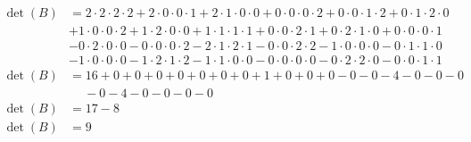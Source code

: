 \documentclass[12pt]{article}
\begin{document}
\[
\begin{aligned}
    \operatorname{det}(B) & = 2 \cdot 2 \cdot 2 \cdot 2 + 2 \cdot 0 \cdot 0 \cdot 1 + 2 \cdot 1 \cdot 0 
    \cdot 0 + 0 \cdot 0 \cdot 0 \cdot 2 + 0 \cdot 0 \cdot 1 \cdot 2 + 0 \cdot 1 \cdot 2 \cdot 0 \\
    &  + 1 \cdot 0 \cdot 0 \cdot 2 + 1 \cdot 2 \cdot 0 \cdot 0 + 1 \cdot 1 \cdot 1 \cdot 1 + 0 \cdot 0 
    \cdot 2 \cdot 1 + 0 \cdot 2 \cdot 1 \cdot 0 + 0 \cdot 0 \cdot 0 \cdot 1 \\
    & - 0 \cdot 2 \cdot 0 \cdot 0 - 0 \cdot 0 \cdot 0 \cdot 2 - 2 \cdot 1 \cdot 2 \cdot 1 - 0 \cdot 0 
    \cdot 2 \cdot 2 - 1 \cdot 0 \cdot 0 \cdot 0 - 0 \cdot 1 \cdot 1 \cdot 0 \\
    & - 1 \cdot 0 \cdot 0 \cdot 0 - 1 \cdot 2 \cdot 1 \cdot 2 - 1 \cdot 1 \cdot 0 \cdot 0 - 0 \cdot 0 
    \cdot 0 \cdot 0 - 0 \cdot 2 \cdot 2 \cdot 0 - 0 \cdot 0 \cdot 1 \cdot 1\\ 
    \operatorname{det}(B) & = 16 + 0 + 0 + 0 + 0 + 0 + 0 + 0 + 1 + 0 + 0 + 0 - 0 - 0 - 4 - 0 - 0 - 0 \\ 
    & \quad \ - 0 - 4 - 0 - 0 - 0 - 0 \\
    \operatorname{det}(B) & = 17-8 \\
    \operatorname{det}(B) & = 9
\end{aligned}
\]
\end{document}
